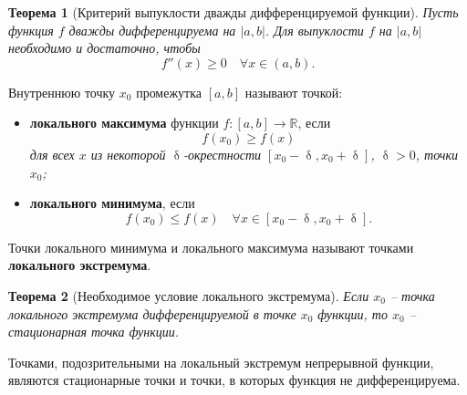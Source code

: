 \documentclass[a4paper, 12pt]{report}
\numberwithin{equation}{section}
\renewcommand{\leq}{\leqslant}
\renewcommand{\geq}{\geqslant}
\renewcommand{\delta}{\updelta}
\newtheorem*{theorem}{Теорема}
\begin{document}
	\begin{theorem}
		[Критерий выпуклости дважды дифференцируемой функции]
		Пусть функция $f$ дважды дифференцируема на $|a,b|$. Для выпуклости $f$ на $|a,b|$ необходимо и достаточно, чтобы
		\begin{equation*}
			f''(x) \geq 0 \quad \forall x \in (a,b).
		\end{equation*}
	\end{theorem}
	\noindent
	{Внутреннюю точку $x_0$ промежутка $[a, b]$ называют точкой:}
	\begin{itemize}
		\item {\textbf{локального максимума} функции $f : [a, b] \to \mathbb{R}$, если}
		\[
		f(x_0) \geq f(x)
		\]
		\textit{для всех $x$ из некоторой $\delta$-окрестности $[x_0 - \delta, x_0 + \delta]$, $\delta > 0$, точки $x_0$;}
		\item {\textbf{локального минимума}, если}
		\[
		f(x_0) \leq f(x) \quad \forall x \in [x_0 - \delta, x_0 + \delta].
		\]
	\end{itemize}
	{Точки локального минимума и локального максимума называют точками \textbf{локального экстремума}}.
	\begin{theorem}
		[Необходимое условие локального экстремума]
		Если $x_0$ -- точка локального экстремума дифференцируемой в точке $x_0$
		функции, то $x_0$ -- стационарная точка функции.
	\end{theorem}
	\noindent
	Точками, подозрительными на локальный экстремум
	непрерывной функции, являются стационарные точки и точки, в которых
	функция не дифференцируема.
\end{document}
